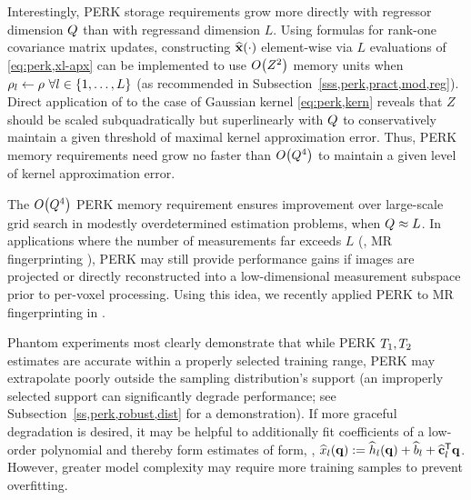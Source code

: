 Interestingly, 
PERK storage requirements
grow more directly with regressor dimension $Q$ 
than with regressand dimension $L$. 
Using formulas for rank-one covariance matrix updates,
constructing $\esta{\bmx}{\cdot}$ element-wise
via $L$ evaluations of \eqref{eq:perk,xl-apx}
can be implemented 
to use $\BigOh{Z^2}$ memory units 
when $\rho_l \gets \rho\,\, \forall l \in \set{1,\dots,L}$
(as recommended in Subsection~\ref{sss,perk,pract,mod,reg}).
Direct application of \cite[Proposition~4]{sutherland:15:ote}
to the case of Gaussian kernel \eqref{eq:perk,kern}
reveals that $Z$ should be scaled 
subquadratically but superlinearly with $Q$ 
to conservatively maintain a given threshold
of maximal kernel approximation error.
Thus, PERK memory requirements need grow no faster than $\BigOh{\dimQ^4}$
to maintain a given level of kernel approximation error.

The $\BigOh{\dimQ^4}$ PERK memory requirement ensures improvement 
over large-scale grid search 
in modestly overdetermined estimation problems, 
\ie when $Q \approx L$.
In applications where 
the number of measurements far exceeds $L$
(\eg, MR fingerprinting \cite{ma:13:mrf}),
PERK may still provide performance gains
if images are projected \cite{mcgivney:14:scf}
or directly reconstructed \cite{asslander::lra}
into a low-dimensional measurement subspace
prior to per-voxel processing.
Using this idea,
we recently applied PERK
to MR fingerprinting
in \cite{nataraj:17:slw}.

Phantom experiments most clearly demonstrate
that while PERK $T_1,T_2$ estimates are accurate
within a properly selected training range,
PERK may extrapolate poorly
outside the sampling distribution's support
(an improperly selected support 
can significantly degrade performance; 
see Subsection~\ref{ss,perk,robust,dist} for a demonstration).
If more graceful degradation is desired,
it may be helpful
to additionally fit coefficients 
of a low-order polynomial
and thereby form estimates of form, \eg, 
$\est{x}_l\paren{\bmq} := 
	\est{h}_l\paren{\bmq} + \est{b}_l + \est{\mathbf{c}}_l\tpose \bmq$.
However,
greater model complexity
may require more training samples
to prevent overfitting.

